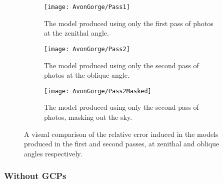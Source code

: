 \begin{figure}
    \centering
    \begin{subfigure}[b]{0.45\textwidth}
        \texttt{[image: AvonGorge/Pass1]}
        \caption{The model produced using only the first pass of photos at the
        zenithal angle.}
        \label{img:avon-gorge/pass-1}
    \end{subfigure}
    \begin{subfigure}[b]{0.45\textwidth}
        \texttt{[image: AvonGorge/Pass2]}
        \caption{The model produced using only the second pass of photos at the
        oblique angle.}
        \label{img:avon-gorge/pass-2}
    \end{subfigure}
    \begin{subfigure}[b]{0.9\textwidth}
        \texttt{[image: AvonGorge/Pass2Masked]}
        \caption{The model produced using only the second pass of photos,
        masking out the sky.}
        \label{img:avon-gorge/pass-2/masked}
    \end{subfigure}
    \caption{A visual comparison of the relative error induced in the models
    produced in the first and second passes, at zenithal and oblique angles
    respectively.}
    \label{img:avon-gorge/passes}
\end{figure}

\subsubsection{Without GCPs}

